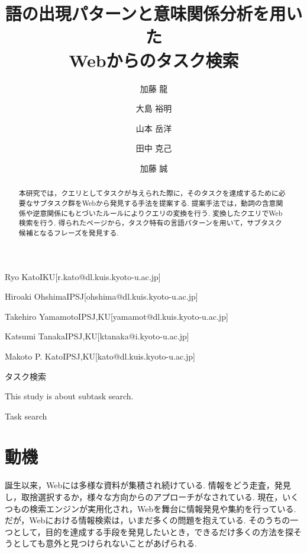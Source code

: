 \documentclass[submit,techreq]{ipsj}
\begin{document}
\title{語の出現パターンと意味関係分析を用いた\\
Webからのタスク検索}







\author{加藤 龍}{Ryo Kato}{IKU}[r.kato@dl.kuis.kyoto-u.ac.jp]
\author{大島 裕明}{Hiroaki Ohshima}{IPSJ}[ohshima@dl.kuis.kyoto-u.ac.jp]
\author{山本 岳洋}{Takehiro Yamamoto}{IPSJ,KU}[yamamot@dl.kuis.kyoto-u.ac.jp]
\author{田中 克己}{Katsumi Tanaka}{IPSJ,KU}[ktanaka@i.kyoto-u.ac.jp]
\author{加藤 誠}{Makoto P. Kato}{IPSJ,KU}[kato@dl.kuis.kyoto-u.ac.jp]

\begin{abstract}
本研究では，クエリとしてタスクが与えられた際に，そのタスクを達成するために必要なサブタスク群をWebから発見する手法を提案する. 提案手法では，動詞の含意関係や逆意関係にもとづいたルールによりクエリの変換を行う. 変換したクエリでWeb検索を行う. 得られたページから，タスク特有の言語パターンを用いて，サブタスク候補となるフレーズを発見する. 
\end{abstract}

\begin{jkeyword}
タスク検索
\end{jkeyword}

\begin{eabstract}
This study is about subtask search.
\end{eabstract}

\begin{ekeyword}
Task search
\end{ekeyword}

\maketitle

\section{動機}

誕生以来，Webには多様な資料が集積され続けている. 情報をどう走査，発見し，取捨選択するか，様々な方向からのアプローチがなされている. 
現在，いくつもの検索エンジンが実用化され，Webを舞台に情報発見や集約を行っている. だが，Webにおける情報検索は，いまだ多くの問題を抱えている. 
そのうちの一つとして，目的を達成する手段を発見したいとき，できるだけ多くの方法を探そうとしても意外と見つけられないことがあげられる.
\end{document}
